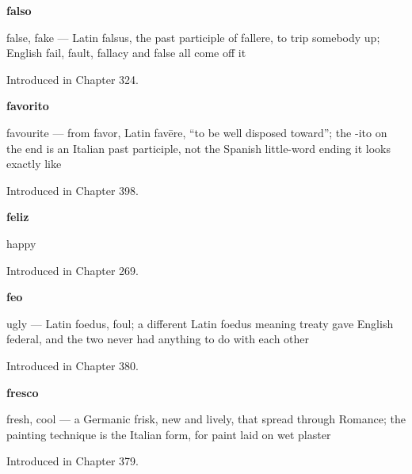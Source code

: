 \noindent\begin{minipage}[t]{\linewidth}
\raggedright
\textbf{falso}\par
\small false, fake — Latin falsus, the past participle of fallere, to trip somebody up; English fail, fault, fallacy and false all come off it\par
\footnotesize Introduced in Chapter 324.
\end{minipage}\par\medskip

\noindent\begin{minipage}[t]{\linewidth}
\raggedright
\textbf{favorito}\par
\small favourite — from favor, Latin favēre, \textquotedblleft{}to be well disposed toward\textquotedblright{}; the -ito on the end is an Italian past participle, not the Spanish little-word ending it looks exactly like\par
\footnotesize Introduced in Chapter 398.
\end{minipage}\par\medskip

\noindent\begin{minipage}[t]{\linewidth}
\raggedright
\textbf{feliz}\par
\small happy\par
\footnotesize Introduced in Chapter 269.
\end{minipage}\par\medskip

\noindent\begin{minipage}[t]{\linewidth}
\raggedright
\textbf{feo}\par
\small ugly — Latin foedus, foul; a different Latin foedus meaning treaty gave English federal, and the two never had anything to do with each other\par
\footnotesize Introduced in Chapter 380.
\end{minipage}\par\medskip

\noindent\begin{minipage}[t]{\linewidth}
\raggedright
\textbf{fresco}\par
\small fresh, cool — a Germanic frisk, new and lively, that spread through Romance; the painting technique is the Italian form, for paint laid on wet plaster\par
\footnotesize Introduced in Chapter 379.
\end{minipage}\par\medskip

